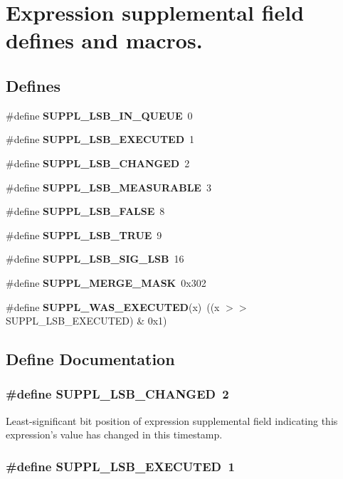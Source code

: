 \section{Expression supplemental field defines and macros.}
\label{group__expr__suppl}
\subsection*{Defines}
\begin{CompactItemize}
\item 
\#define {\bf SUPPL\_\-LSB\_\-IN\_\-QUEUE}\ 0
\item 
\#define {\bf SUPPL\_\-LSB\_\-EXECUTED}\ 1
\item 
\#define {\bf SUPPL\_\-LSB\_\-CHANGED}\ 2
\item 
\#define {\bf SUPPL\_\-LSB\_\-MEASURABLE}\ 3
\item 
\#define {\bf SUPPL\_\-LSB\_\-FALSE}\ 8
\item 
\#define {\bf SUPPL\_\-LSB\_\-TRUE}\ 9
\item 
\#define {\bf SUPPL\_\-LSB\_\-SIG\_\-LSB}\ 16
\item 
\#define {\bf SUPPL\_\-MERGE\_\-MASK}\ 0x302
\item 
\#define {\bf SUPPL\_\-WAS\_\-EXECUTED}(x)\ ((x $>$$>$ SUPPL\_\-LSB\_\-EXECUTED) \& 0x1)
\end{CompactItemize}


\subsection{Define Documentation}
\subsubsection{\setlength{\rightskip}{0pt plus 5cm}\#define SUPPL\_\-LSB\_\-CHANGED\ 2}\label{group__expr__suppl_a2}


Least-significant bit position of expression supplemental field indicating this expression's value has changed in this timestamp. 
\subsubsection{\setlength{\rightskip}{0pt plus 5cm}\#define SUPPL\_\-LSB\_\-EXECUTED\ 1}\label{group__expr__suppl_a1}


